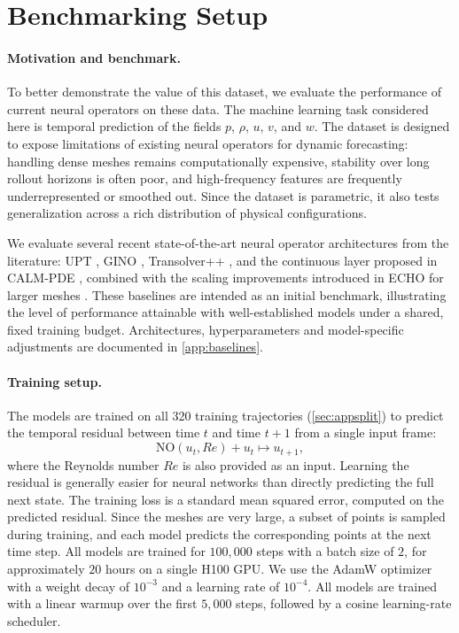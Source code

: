 \documentclass{article}
\begin{document}

\section{Benchmarking Setup}
\paragraph{Motivation and benchmark.}
To better demonstrate the value of this dataset, we evaluate the performance of current neural operators on these data. The machine learning task considered here is temporal prediction of the \textcolor{revcolor}{fields $p$, $\rho$, $u$, $v$, and $w$. The dataset is designed to expose limitations of existing neural operators for dynamic forecasting}: handling dense meshes remains computationally expensive, stability over long rollout horizons is often poor, and high-frequency features are frequently underrepresented or smoothed out. Since the dataset is parametric, it also tests generalization across a rich distribution of physical configurations.

We evaluate several recent state-of-the-art neural operator architectures from the literature: UPT \citep{Alkin2024}, GINO \citep{li2023geometry}, Transolver++ \citep{luotransolverplus}, and the continuous layer proposed in CALM-PDE \citep{calmpde}, combined with the scaling improvements introduced in ECHO for larger meshes \citep{koupai2025efficientgenerativetransformeroperators}. \textcolor{revcolor}{These baselines are intended as an initial benchmark, illustrating the level of performance attainable with well-established models under a shared, fixed training budget. Architectures, hyperparameters and model-specific adjustments are documented in \autoref{app:baselines}.}

\paragraph{Training setup.}
The models are trained \textcolor{revcolor}{on all 320 training trajectories (\autoref{sec:appsplit})} to predict the temporal residual between time \(t\) and time \(t+1\) from a single input frame:
\[
    \mathrm{NO}(u_t, Re) + u_t \mapsto u_{t+1},
\]
where the Reynolds number \(Re\) is also provided as an input. Learning the residual is generally easier for neural networks than directly predicting the full next state. The training loss is a standard mean squared error, computed on the predicted residual. Since the meshes are very large, a subset of points is sampled during training, and each model predicts the corresponding points at the next time step. All models are trained for \(100{,}000\) steps with a batch size of \(2\), for approximately \(20\) hours on a single H100 GPU. We use the AdamW optimizer with a weight decay of \(10^{-3}\) and a learning rate of \(10^{-4}\). All models are trained with a linear warmup over the first \(5{,}000\) steps, followed by a cosine learning-rate scheduler.
\end{document}
